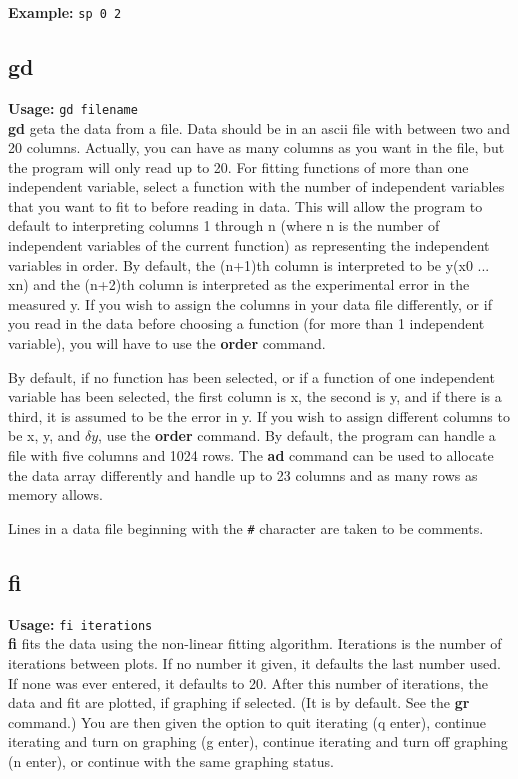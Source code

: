         {\bf Example: } {\tt sp 0 2}

\subsection{gd}     {\bf Usage: } {\tt  gd filename} \\

        {\bf gd } geta the data from a file.  Data should be in an 
 ascii file with between two and 20 columns. Actually, you can have
 as many columns as you want in the file, but the program will only
 read up to 20.  For fitting
 functions of more than one independent variable, select a 
 function with the number of independent variables that you 
 want to fit to before reading in data.  This will allow the 
 program to default to interpreting columns 1 through n 
 (where n is the number of independent variables of the
 current function) as representing the independent variables
 in order.  By default, the (n+1)th column is interpreted to
 be y(x0 ... xn) and the (n+2)th column is interpreted as 
 the experimental error in the measured y.  If you wish to 
 assign the columns in your data file differently, or if you
 read in the data before choosing a function (for more than 
 1 independent variable), you will have to use the {\bf order}
 command.
 
 By default, if no function has been selected, or if a
 function of one independent variable has been selected,
 the first column is x, the second is y, and if there is a
 third, it is assumed to be the error in y.  If you wish to
 assign different columns to be x, y, and $\delta y$, use the
 {\bf order} command.  By default, the program can handle a file
 with five columns and 1024 rows.  The {\bf ad} command can be
 used to allocate the data array differently and handle up 
 to 23 columns and as many rows as memory allows.

 Lines in a data file beginning with the \verb+#+ character are taken
 to be comments.


\subsection{fi}     {\bf Usage: } {\tt  fi iterations} \\

        {\bf fi }fits the data using the non-linear fitting
 algorithm. Iterations is the  number of iterations between 
 plots.  If no number it given, it defaults the last number 
 used.  If none was ever entered, it defaults to 20. After 
 this number of iterations, the data and fit are plotted, if
 graphing if selected.  (It is by default.  See the {\bf gr}
 command.)  You are then given the option to quit iterating 
 (q enter), continue iterating and turn on graphing 
 (g enter), continue iterating and turn off graphing
 (n enter), or continue with the same graphing status.  

